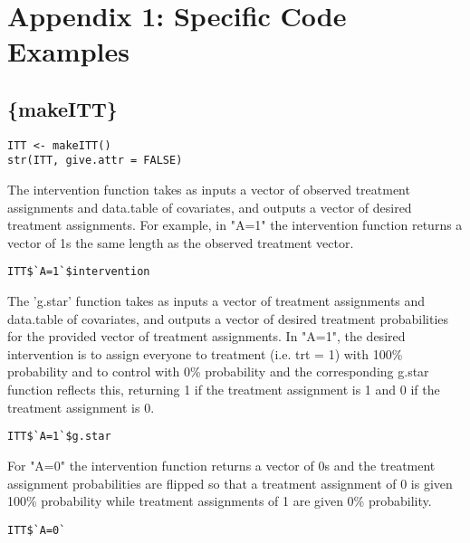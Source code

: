\documentclass{report}
\newcommand{\1}{\ensuremath{\mathbf{1}}}
\begin{document}
\section{Appendix 1: Specific Code Examples}
\label{sec:org7714d69}
\subsection{\{makeITT\}}
\label{sec:orgf59eb68}

\begin{lstlisting}
ITT <- makeITT()
str(ITT, give.attr = FALSE)
\end{lstlisting}

The intervention function takes as inputs a vector of observed treatment assignments and data.table of covariates, and outputs a vector of desired treatment assignments. For example, in "A=1" the intervention function returns a vector of 1s the same length as the observed treatment vector.

\begin{lstlisting}
ITT$`A=1`$intervention
\end{lstlisting}

The 'g.star' function takes as inputs a vector of treatment assignments and data.table of covariates, and outputs a vector of desired treatment probabilities for the provided vector of treatment assignments. In "A=1", the desired intervention is to assign everyone to treatment (i.e. trt = 1) with 100\% probability and to control with 0\% probability and the corresponding g.star function reflects this, returning 1 if the treatment assignment is 1 and 0 if the treatment assignment is 0.

\begin{lstlisting}
ITT$`A=1`$g.star
\end{lstlisting}


For "A=0" the intervention function returns a vector of 0s and the treatment assignment probabilities are flipped so that a treatment assignment of 0 is given 100\% probability while treatment assignments of 1 are given 0\% probability.

\begin{lstlisting}
ITT$`A=0`
\end{lstlisting}
\end{document}
